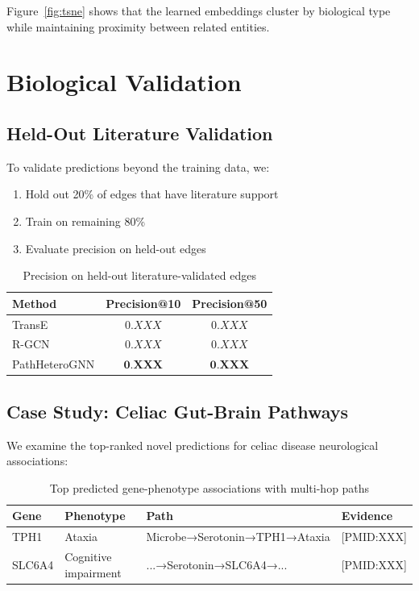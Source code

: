 \documentclass[twoside]{article}
\begin{document}
Figure~\ref{fig:tsne} shows that the learned embeddings cluster by biological type while maintaining proximity between related entities.

\section{Biological Validation}

\subsection{Held-Out Literature Validation}

To validate predictions beyond the training data, we:
\begin{enumerate}
    \item Hold out 20\% of edges that have literature support
    \item Train on remaining 80\%
    \item Evaluate precision on held-out edges
\end{enumerate}

\begin{table}[t]
\centering
\caption{Precision on held-out literature-validated edges}
\label{tab:literature}
\begin{tabular}{lcc}
\toprule
\textbf{Method} & \textbf{Precision@10} & \textbf{Precision@50} \\
\midrule
TransE & $0.XXX$ & $0.XXX$ \\
R-GCN & $0.XXX$ & $0.XXX$ \\
PathHeteroGNN & $\mathbf{0.XXX}$ & $\mathbf{0.XXX}$ \\
\bottomrule
\end{tabular}
\end{table}

\subsection{Case Study: Celiac Gut-Brain Pathways}

We examine the top-ranked novel predictions for celiac disease neurological associations:

\begin{table}[t]
\centering
\caption{Top predicted gene-phenotype associations with multi-hop paths}
\label{tab:case_study}
\begin{tabular}{llll}
\toprule
\textbf{Gene} & \textbf{Phenotype} & \textbf{Path} & \textbf{Evidence} \\
\midrule
TPH1 & Ataxia & Microbe→Serotonin→TPH1→Ataxia & [PMID:XXX] \\
SLC6A4 & Cognitive impairment & ...→Serotonin→SLC6A4→... & [PMID:XXX] \\
\bottomrule
\end{tabular}
\end{table}
\end{document}
